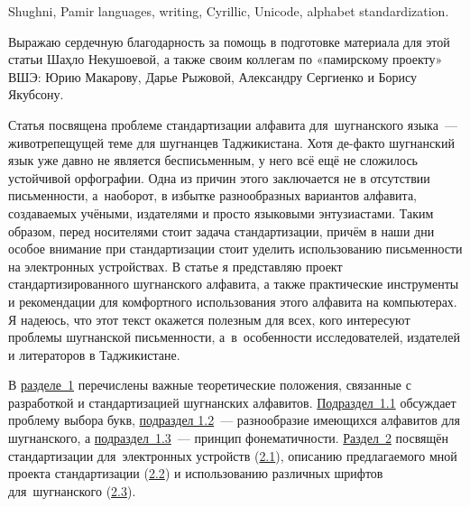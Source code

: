 \begin{eng-keywords}
Shughni, Pamir languages, writing, Cyrillic, Unicode, alphabet standardization.
\end{eng-keywords}

\begin{acknowledgements}
Выражаю сердечную благодарность за помощь в подготовке материала для этой статьи Шаҳло Некушоевой, а также своим коллегам по «памирскому проекту» ВШЭ: Юрию Макарову, Дарье Рыжовой, Александру Сергиенко и Борису Якубсону.
\end{acknowledgements}

\begin{initialprint}
\end{initialprint}

\label{ortho-intro}

Статья посвящена проблеме стандартизации алфавита для~шугнанского языка~— животрепещущей теме для шугнанцев Таджикистана. Хотя де-факто шугнанский язык уже давно не является бесписьменным, у него всё ещё не сложилось устойчивой орфографии. Одна из причин этого заключается не в отсутствии письменности, а~наоборот, в избытке разнообразных вариантов алфавита, создаваемых учёными, издателями и просто языковыми энтузиастами. Таким образом, перед носителями стоит задача стандартизации, причём в наши дни особое внимание при стандартизации стоит уделить использованию письменности на электронных устройствах. В статье я представляю проект стандартизированного шугнанского алфавита, а также практические инструменты и рекомендации для комфортного использования этого алфавита на компьютерах. Я надеюсь, что этот текст окажется полезным для всех, кого интересуют проблемы шугнанской письменности, а~в~особенности исследователей, издателей и литераторов в Таджикистане.

В \hyperref[ortho-theory]{разделе~1} перечислены важные теоретические положения, связанные с разработкой и стандартизацией шугнанских алфавитов. \hyperref[ortho-choice]{Подраздел~1.1} обсуждает проблему выбора букв, \hyperref[ortho-diversity]{подраздел 1.2}~— разнообразие имеющихся алфавитов для шугнанского, а \hyperref[ortho-phoneme]{подраздел~1.3}~— принцип фонематичности. \hyperref[ortho-practice]{Раздел~2} посвящён стандартизации для~электронных устройств (\hyperref[ortho-standard]{2.1}), описанию предлагаемого мной проекта стандартизации (\hyperref[ortho-project]{2.2}) и использованию различных шрифтов для~шугнанского (\hyperref[ortho-fonts]{2.3}).

\pagebreak[4]

